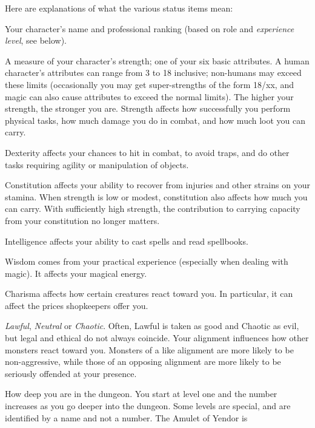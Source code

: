 Here are explanations of what the various status items mean:

\blist{}
\item[\bb{Title}]
Your character's name and professional ranking (based on role and
{\it experience level\/}, see below).
\item[\bb{Strength}]
A measure of your character's strength; one of your six basic
attributes.  A human character's attributes can range from 3 to 18 inclusive;
non-humans may exceed these limits
(occasionally you may get super-strengths of the form 18/xx, and magic can
also cause attributes to exceed the normal limits).  The
higher your strength, the stronger you are.  Strength affects how
successfully you perform physical tasks, how much damage you do in
combat, and how much loot you can carry.
\item[\bb{Dexterity}]
Dexterity affects your chances to hit in combat, to avoid traps, and
do other tasks requiring agility or manipulation of objects.
\item[\bb{Constitution}]
Constitution affects your ability to recover from injuries and other
strains on your stamina.
When strength is low or modest, constitution also affects how much you
can carry.  With sufficiently high strength, the contribution to
carrying capacity from your constitution no longer matters.
\item[\bb{Intelligence}]
Intelligence affects your ability to cast spells and read spellbooks.
\item[\bb{Wisdom}]
Wisdom comes from your practical experience (especially when dealing with
magic).  It affects your magical energy.
\item[\bb{Charisma}]
Charisma affects how certain creatures react toward you.  In
particular, it can affect the prices shopkeepers offer you.
\item[\bb{Alignment}]
%
{\it Lawful}, {\it Neutral\/} or {\it Chaotic}.  Often, Lawful is
taken as good and Chaotic as evil, but legal and ethical do not always
coincide.  Your alignment influences how other
monsters react toward you.  Monsters of a like alignment are more likely
to be non-aggressive, while those of an opposing alignment are more likely
to be seriously offended at your presence.
\item[\bb{Dungeon Level}]
How deep you are in the dungeon.  You start at level one and the number
increases as you go deeper into the dungeon.  Some levels are special,
and are identified by a name and not a number.  The Amulet of Yendor is
